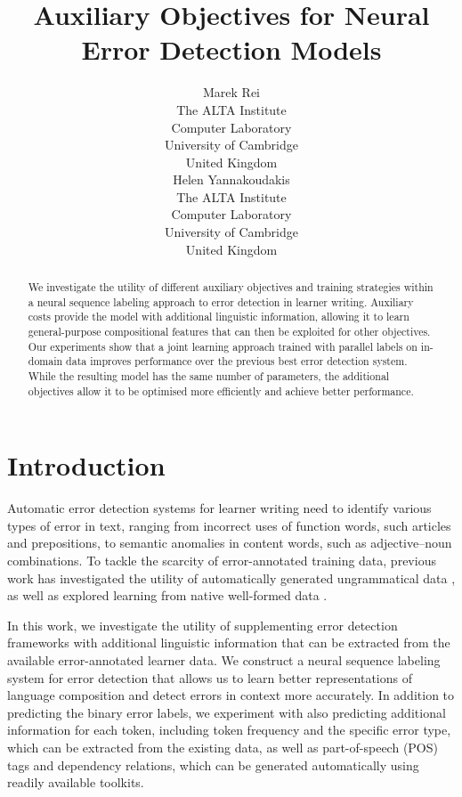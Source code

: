\documentclass[11pt,letterpaper]{article}
\title{Auxiliary Objectives for Neural Error Detection Models}
\author{\hspace{-0.5cm}Marek Rei\\
	    \hspace{-0.5cm}The ALTA Institute\\
	    \hspace{-0.5cm}Computer Laboratory\\
	    \hspace{-0.5cm}University of Cambridge\\
        \hspace{-0.5cm}United Kingdom\\
	    \hspace{-0.5cm}{\tt marek.rei@cl.cam.ac.uk}
	    \And
	    \hspace{0.5cm}Helen Yannakoudakis\\
	    \hspace{0.5cm}The ALTA Institute\\
	    \hspace{0.5cm}Computer Laboratory\\
	    \hspace{0.5cm}University of Cambridge\\
        \hspace{0.5cm}United Kingdom\\
        \hspace{0.5cm}{\tt helen.yannakoudakis@cl.cam.ac.uk}}
\date{}
\begin{document}
\maketitle

\begin{abstract}
We investigate the utility of different auxiliary objectives and training strategies within a neural sequence labeling approach to error detection in learner writing. 
Auxiliary costs provide the model with additional linguistic information, allowing it to learn general-purpose compositional features that can then be exploited for other objectives.
Our experiments show that a joint learning approach trained with parallel labels on in-domain data improves performance over the previous best error detection system. 
While the resulting model has the same number of parameters, the additional objectives allow it to be optimised more efficiently and achieve better performance.
\end{abstract}


\section{Introduction}



Automatic error detection systems for learner writing need to identify various types of error in text, ranging from incorrect uses of function words, such articles and prepositions, to semantic anomalies in content words, such as adjective--noun combinations.
To tackle the scarcity of error-annotated training data, previous work has investigated the utility of automatically generated ungrammatical data \cite{foster2009generrate,felice2014generating}, as well as explored learning from native well-formed data \cite{rozovskaya2016grammatical,gamon2010using}. 

In this work, we investigate the utility of supplementing error detection frameworks with additional linguistic information that can be extracted from the available error-annotated learner data. 
We construct a neural sequence labeling system for error detection that allows us to learn better representations of language composition and detect errors in context more accurately. 
In addition to predicting the binary error labels, we experiment with also predicting additional information for each token, including token frequency and the specific error type,
which can be extracted from the existing data, as well as part-of-speech (POS) tags and dependency relations, which can be generated automatically using readily available toolkits. 
\end{document}
